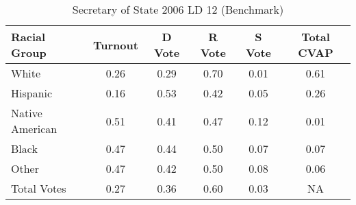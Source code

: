\begin{table}[htb]
\begin{center}
\caption{Secretary of State 2006 LD 12 (Benchmark)}
\label{sos06_cvap_ld_12_benchmark}
\begin{tabular}{lccccc}
  \hline
Racial Group & Turnout & D Vote & R Vote & S Vote & Total CVAP \\ 
  \hline
    White & 0.26  & 0.29  & 0.70  & 0.01  & 0.61 \\
    Hispanic & 0.16  & 0.53  & 0.42  & 0.05  & 0.26 \\
    Native American & 0.51  & 0.41  & 0.47  & 0.12  & 0.01 \\
    Black & 0.47  & 0.44  & 0.50  & 0.07  & 0.07 \\
    Other & 0.47  & 0.42  & 0.50  & 0.08  & 0.06 \\
    Total Votes & 0.27  & 0.36  & 0.60  & 0.03  &  NA \\
   \hline
\end{tabular}
\end{center}
\end{table}

